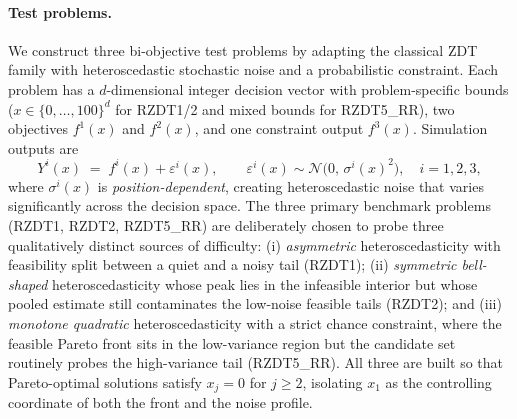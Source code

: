 \documentclass[12pt]{article}
\theoremstyle{plain}
\theoremstyle{definition}
\theoremstyle{remark}
\newcommand{\cN}{\mathcal{N}}
\begin{document}
\paragraph{Test problems.}
We construct three bi-objective test problems by adapting the classical
ZDT family \citep{Zitzler2000} with heteroscedastic stochastic noise and
a probabilistic constraint.  Each problem has a $d$-dimensional integer
decision vector with problem-specific bounds ($x\in\{0,\ldots,100\}^{d}$
for RZDT1/2 and mixed bounds for RZDT5\_RR), two objectives
$f^{1}(x)$ and $f^{2}(x)$, and one constraint output $f^{3}(x)$.
Simulation outputs are
\begin{equation}\label{eq:sim_noise}
  Y^{i}(x) \;=\; f^{i}(x) + \varepsilon^{i}(x),\qquad
  \varepsilon^{i}(x)\sim\cN\!\bigl(0,\,\sigma^{i}(x)^{2}\bigr),
  \quad i=1,2,3,
\end{equation}
where $\sigma^{i}(x)$ is \emph{position-dependent}, creating heteroscedastic
noise that varies significantly across the decision space.  The three
primary benchmark problems (RZDT1, RZDT2, RZDT5\_RR) are deliberately
chosen to probe three qualitatively distinct sources of difficulty: (i)
\emph{asymmetric} heteroscedasticity with feasibility split between a
quiet and a noisy tail (RZDT1); (ii) \emph{symmetric bell-shaped}
heteroscedasticity whose peak lies in the infeasible interior but whose
pooled estimate still contaminates the low-noise feasible tails (RZDT2);
and (iii) \emph{monotone quadratic} heteroscedasticity with a strict
chance constraint, where the feasible Pareto front sits in the
low-variance region but the candidate set routinely probes the
high-variance tail (RZDT5\_RR).  All
three are built so that Pareto-optimal solutions satisfy $x_j=0$ for
$j\ge2$, isolating $x_1$ as the controlling coordinate of both the
front and the noise profile.
\end{document}
